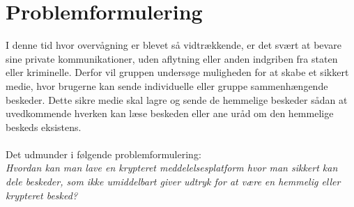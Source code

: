 \section{Problemformulering}
I denne tid hvor overvågning er blevet så vidtrækkende, er det svært at bevare sine private kommunikationer, uden aflytning eller anden indgriben fra staten eller kriminelle. Derfor vil gruppen undersøge muligheden for at skabe et sikkert medie, hvor brugerne kan sende individuelle eller gruppe sammenhængende beskeder. Dette sikre medie skal lagre og sende de hemmelige beskeder sådan at uvedkommende hverken kan læse beskeden eller ane uråd om den hemmelige beskeds eksistens. 
\\\\
Det udmunder i følgende problemformulering:
\\
\textit{Hvordan kan man lave en krypteret meddelelsesplatform hvor man sikkert kan dele beskeder, som ikke umiddelbart giver udtryk for at være en hemmelig eller krypteret besked?}